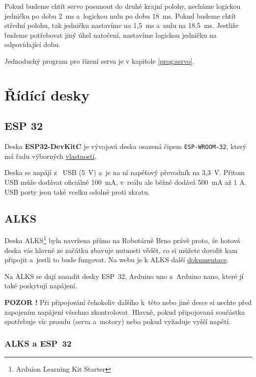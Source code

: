 Pokud budeme chtít servo posunout do druhé krajní polohy, necháme logickou jedničku po dobu 2~ms a~logickou nulu po dobu 18~ms. 
Pokud budeme chtít střední polohu, tak jedničku nastavíme na 1,5~ms a~nulu na 18,5~ms. 
Jestliže budeme potřebovat jiný úhel natočení, nastavíme logickou jedničku na odpovídající dobu.

Jednoduchý program pro řízení serva je v kapitole \ref{prog:servo}.


\section{Řídící desky} \label{ridici_desky}

 \subsection{ESP 32} \label{esp32}

Deska {\bf ESP32-DevKitC}  je vývojová deska osazená čipem {\tt ESP-WROOM-32}, který má řadu výborných \href{https://en.wikipedia.org/wiki/ESP32}{vlastností}.

Deska se napájí z~ USB (5~V) a~je na ní napěťový převodník
na 3,3~V. Přitom USB může dodávat oficiálně 100~mA, v~reálu ale běžně dodává 500~mA až 1 A. USB porty jsou také vcelku odolné proti zkratu.   

 \subsection{ALKS} \label{alks}  

Deska ALKS\footnote{Arduion Learning Kit Starter} byla navržena přímo na Robotárně Brno právě proto, že 
hotová deska   
vás hlavně ze začátku zbavuje nutnosti vědět, co si můžete dovolit kam připojit a~jestli to bude fungovat. 
Na webu je k ALKS další \href{https://github.com/RoboticsBrno/ArduinoLearningKitStarter}{dokumentace}.

Na ALKS se dají nasadit desky ESP~32, Arduino uno  a~Arduino nano, které jí také poskytují napájení.  

{\bf POZOR !} Při připojování čehokoliv dalšího k~této nebo jiné desce si nechte před zapojením napájení všechno zkontrolovat. Hlavně, pokud připojovaná součástka spotřebuje víc proudu (serva a~motory) nebo pokud vyžaduje vyšší napětí. 

\label{alks:knihovna} \subsubsection*{ALKS a ESP~32}

